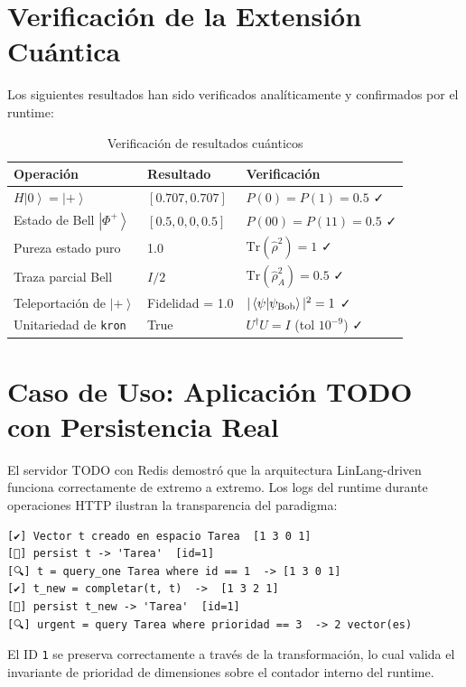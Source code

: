 \documentclass[12pt, a4paper, openany]{report}
\theoremstyle{definition}
\newcommand{\ket}[1]{\left|#1\right\rangle}
\newcommand{\density}{\hat{\rho}}
\newcommand{\tr}{\mathrm{Tr}}
\begin{document}
\section{Verificación de la Extensión Cuántica}

Los siguientes resultados han sido verificados analíticamente y confirmados por el runtime:

\begin{table}[H]
\centering
\caption{Verificación de resultados cuánticos}
\begin{tabularx}{\linewidth}{@{}L{4.5cm}L{3cm}L{4.5cm}@{}}
\toprule
\textbf{Operación} & \textbf{Resultado} & \textbf{Verificación} \\
\midrule
$H\ket{0} = \ket{+}$ & $[0.707, 0.707]$ & $P(0) = P(1) = 0.5$ ✓ \\
Estado de Bell $\ket{\Phi^+}$ & $[0.5, 0, 0, 0.5]$ & $P(00) = P(11) = 0.5$ ✓ \\
Pureza estado puro & 1.0 & $\tr(\density^2) = 1$ ✓ \\
Traza parcial Bell & $I/2$ & $\tr(\density_A^2) = 0.5$ ✓ \\
Teleportación de $\ket{+}$ & Fidelidad = 1.0 & $|\braket{\psi|\psi_\text{Bob}}|^2 = 1$ ✓ \\
Unitariedad de \texttt{kron} & True & $U^\dagger U = I$ (tol $10^{-9}$) ✓ \\
\bottomrule
\end{tabularx}
\end{table}

\section{Caso de Uso: Aplicación TODO con Persistencia Real}

El servidor TODO con Redis demostró que la arquitectura LinLang-driven funciona correctamente de extremo a extremo. Los logs del runtime durante operaciones HTTP ilustran la transparencia del paradigma:

\begin{lstlisting}[caption={Log de runtime LinLang durante requests HTTP}]
[✔️] Vector t creado en espacio Tarea  [1 3 0 1]
[💾] persist t -> 'Tarea'  [id=1]
[🔍] t = query_one Tarea where id == 1  -> [1 3 0 1]
[✔️] t_new = completar(t, t)  ->  [1 3 2 1]
[💾] persist t_new -> 'Tarea'  [id=1]
[🔍] urgent = query Tarea where prioridad == 3  -> 2 vector(es)
\end{lstlisting}

El ID \texttt{1} se preserva correctamente a través de la transformación, lo cual valida el invariante de prioridad de dimensiones sobre el contador interno del runtime.
\end{document}
